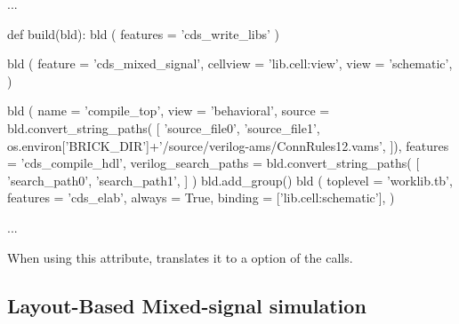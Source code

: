 \begin{lstwscript}
...

def build(bld):
    bld ( features = 'cds_write_libs' )

    bld (
        feature = 'cds_mixed_signal',
        cellview = 'lib.cell:view',
        view = 'schematic',
    )

    bld (
        name = 'compile_top',
        view = 'behavioral',
        source = bld.convert_string_paths(
            [
                'source_file0',
                'source_file1',
                os.environ['BRICK_DIR']+'/source/verilog-ams/ConnRules12.vams',
            ]),
        features = 'cds_compile_hdl',
        verilog_search_paths = bld.convert_string_paths(
            [
                'search_path0',
                'search_path1',
            ]
    )
    bld.add_group()
    bld (
        toplevel = 'worklib.tb',
        features = 'cds_elab',
        always = True,
        binding = ['lib.cell:schematic'],
    )

...
\end{lstwscript}

When using this attribute,  translates it to a  option of
the  calls.

\subsection{Layout-Based Mixed-signal simulation}

%
%
%
%
%
%

